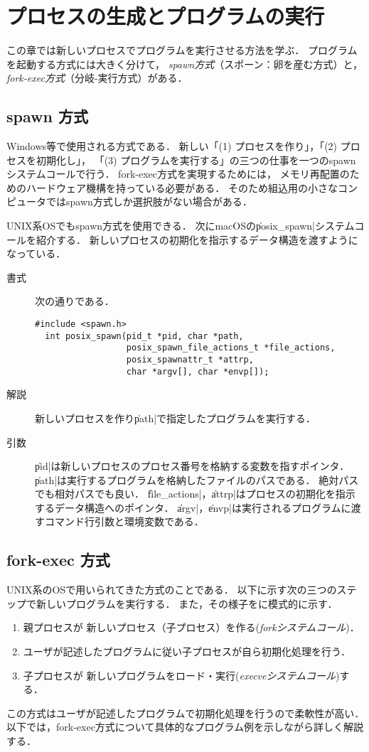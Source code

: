 \chapter{プロセスの生成とプログラムの実行}
この章では新しいプロセスでプログラムを実行させる方法を学ぶ．
プログラムを起動する方式には大きく分けて，
\emph{spawn方式}（スポーン：卵を産む方式）と，
\emph{fork-exec方式}（分岐-実行方式）がある．

\section{spawn 方式}
Windows等で使用される方式である．
新しい「(1) プロセスを作り」，「(2) プロセスを初期化し」，
「(3) プログラムを実行する」の三つの仕事を一つのspawnシステムコールで行う．
fork-exec方式を実現するためには，
メモリ再配置のためのハードウェア機構を持っている必要がある．
そのため組込用の小さなコンピュータではspawn方式しか選択肢がない場合がある．

UNIX系OSでもspawn方式を使用できる．
次にmacOSの\|posix_spawn|システムコールを紹介する．
新しいプロセスの初期化を指示するデータ構造を渡すようになっている．

\begin{description}
\item[書式] 次の通りである．
\begin{lstlisting}[numbers=none]
  #include <spawn.h>
  int posix_spawn(pid_t *pid, char *path,
                  posix_spawn_file_actions_t *file_actions,
                  posix_spawnattr_t *attrp,
                  char *argv[], char *envp[]);
\end{lstlisting}

\item[解説]
  新しいプロセスを作り\|path|で指定したプログラムを実行する．

\item[引数]
  \|pid|は新しいプロセスのプロセス番号を格納する変数を指すポインタ．
  \|path|は実行するプログラムを格納したファイルのパスである．
  絶対パスでも相対パスでも良い．
  \|file_actions|，\|attrp|はプロセスの初期化を指示するデータ構造へのポインタ．
  \|argv|，\|envp|は実行されるプログラムに渡すコマンド行引数と環境変数である．
\end{description}

\section{fork-exec 方式}
UNIX系のOSで用いられてきた方式のことである．
以下に示す次の三つのステップで新しいプログラムを実行する．
また，その様子をに模式的に示す．
\begin{enumerate}
\item 親プロセスが
  新しいプロセス（子プロセス）を作る(\emph{forkシステムコール})．
\item ユーザが記述したプログラムに従い子プロセスが自ら初期化処理を行う．
\item 子プロセスが
  新しいプログラムをロード・実行(\emph{execveシステムコール})する．
\end{enumerate}
この方式はユーザが記述したプログラムで初期化処理を行うので柔軟性が高い．
以下では，fork-exec方式について具体的なプログラム例を示しながら詳しく解説する．

